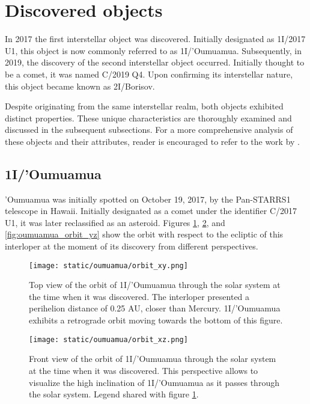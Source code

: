 \section{Discovered objects}

In 2017 the first interstellar object was discovered. Initially designated as
1I/2017 U1, this object is now commonly referred to as 1I/'Oumuamua.
Subsequently, in 2019, the discovery of the second interstellar object occurred.
Initially thought to be a comet, it was named C/2019 Q4. Upon confirming its
interstellar nature, this object became known as 2I/Borisov.

Despite originating from the same interstellar realm, both objects exhibited
distinct properties. These unique characteristics are thoroughly examined and
discussed in the subsequent subsections. For a more comprehensive analysis of
these objects and their attributes, reader is encouraged to refer to the work
by \cite{jewitt2022}.

\subsection{1I/'Oumuamua}

'Oumuamua was initially spotted on October 19, 2017, by the Pan-STARRS1
telescope in Hawaii. Initially designated as a comet under the identifier C/2017
U1, it was later reclassified as an asteroid. Figures \ref{fig:oumuamua_orbit},
\ref{fig:oumuamua_orbit_xz}, and \ref{fig:oumuamua_orbit_yz} show the orbit with
respect to the ecliptic of this interloper at the moment of its discovery from
different perspectives.

\begin{figure}[H]
  \centering
  \texttt{[image: static/oumuamua/orbit\_xy.png]}
  \caption[Top view of the orbit of 1I/'Oumuamua through the solar system]{
    Top view of the orbit of 1I/'Oumuamua through the solar system at the time when it was
    discovered. The interloper presented a perihelion distance of 0.25 AU,
    closer than Mercury. 1I/'Oumuamua exhibits a retrograde orbit moving
    towards the bottom of this figure.
  }
  \label{fig:oumuamua_orbit}
\end{figure}

\begin{figure}[H]
  \centering
  \texttt{[image: static/oumuamua/orbit\_xz.png]}
  \caption[Front view of the orbit of 1I/'Oumuamua through the solar system]{
    Front view of the orbit of 1I/'Oumuamua through the solar system at the time when it was
    discovered. This perspective allows to visualize the high inclination of
    1I/'Oumuamua as it passes through the solar system. Legend shared with
        figure \ref{fig:oumuamua_orbit}.}
  \label{fig:oumuamua_orbit_xz}
\end{figure}

